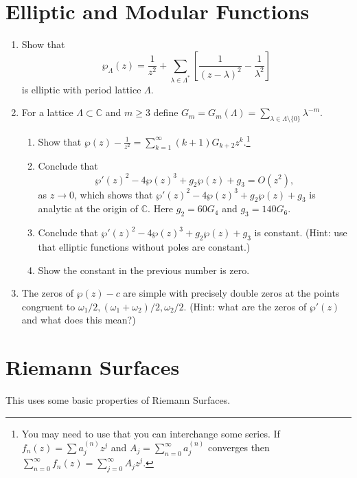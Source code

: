 \documentclass[a4paper,10pt]{article}
\newcommand{\CC}{\mathbb{C}}
\begin{document}
\newpage

\section{Elliptic and Modular Functions} 

\begin{enumerate}
\item Show that 
$$ \wp_{\Lambda}(z) = \frac{1}{z^2} + \sum_{\lambda \in \Lambda^*} \left[ \frac{1}{(z-\lambda)^2} - \frac{1}{\lambda^2} \right] $$
is elliptic with period lattice $\Lambda$.

\item For a lattice $\Lambda \subset \CC$ and $m\geq 3$ define $G_m = G_m(\Lambda) =  \sum_{\lambda \in \Lambda\setminus \lbrace 0 \rbrace } \lambda^{-m}. $   
\begin{enumerate}
	\item Show that $ \wp(z) - \frac{1}{z^2} = \sum_{k=1}^{\infty} (k+1)G_{k+2} z^k.$\footnote{You may need to use that you can interchange some series. If $f_n(z) = \sum a_j^{(n)} z^j$ and $A_j = \sum_{n=0}^{\infty} a_j^{(n)} $ converges then $\sum_{n=0}^{\infty} f_n(z) = \sum_{j=0}^{\infty} A_j z^j$. } 
	\item Conclude that 
	$$ \wp'(z)^2 - 4 \wp(z)^3 + g_2 \wp(z) + g_3 = O(z^2),$$
	as $z \to 0$, which shows that $\wp'(z)^2 - 4 \wp(z)^3 + g_2 \wp(z) + g_3$ is analytic at the origin of $\CC$. 
	Here $g_2 = 60 G_4$ and $g_3 = 140 G_6$.
	\item Conclude that $\wp'(z)^2 - 4 \wp(z)^3 + g_2 \wp(z) + g_3$ is constant. (Hint: use that elliptic functions without poles are constant.)
	\item Show the constant in the previous number is zero.
\end{enumerate}

\item The zeros of $\wp(z)-c$ are simple with precisely double zeros at the points congruent to $\omega_1/2, (\omega_1+\omega_2)/2, \omega_2/2$. (Hint: what are the zeros of $\wp'(z)$ and what does this mean?)

\end{enumerate}


\newpage
\section{Riemann Surfaces}
This uses some basic properties of Riemann Surfaces.
\end{document}
